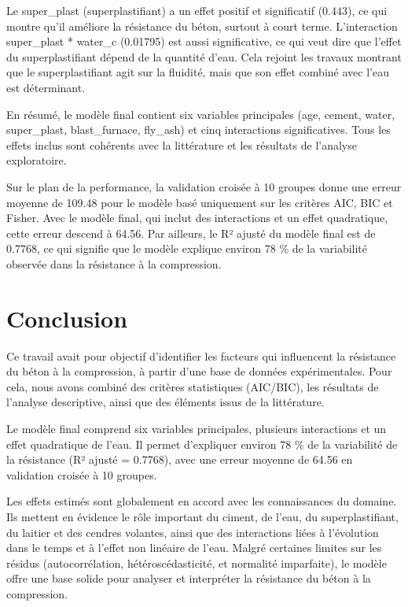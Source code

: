 \documentclass[
  12pt,
]{article}
\begin{document}
Le super\_plast (superplastifiant) a un effet positif et significatif
(0.443), ce qui montre qu'il améliore la résistance du béton, surtout à
court terme. L'interaction super\_plast * water\_c (0.01795) est aussi
significative, ce qui veut dire que l'effet du superplastifiant dépend
de la quantité d'eau. Cela rejoint les travaux montrant que le
superplastifiant agit sur la fluidité, mais que son effet combiné avec
l'eau est déterminant.

En résumé, le modèle final contient six variables principales (age,
cement, water, super\_plast, blast\_furnace, fly\_ash) et cinq
interactions significatives. Tous les effets inclus sont cohérents avec
la littérature et les résultats de l'analyse exploratoire.

Sur le plan de la performance, la validation croisée à 10 groupes donne
une erreur moyenne de 109.48 pour le modèle basé uniquement sur les
critères AIC, BIC et Fisher. Avec le modèle final, qui inclut des
interactions et un effet quadratique, cette erreur descend à 64.56. Par
ailleurs, le R² ajusté du modèle final est de 0.7768, ce qui signifie
que le modèle explique environ 78 \% de la variabilité observée dans la
résistance à la compression.

\section{Conclusion}\label{conclusion}

Ce travail avait pour objectif d'identifier les facteurs qui influencent
la résistance du béton à la compression, à partir d'une base de données
expérimentales. Pour cela, nous avons combiné des critères statistiques
(AIC/BIC), les résultats de l'analyse descriptive, ainsi que des
éléments issus de la littérature.

Le modèle final comprend six variables principales, plusieurs
interactions et un effet quadratique de l'eau. Il permet d'expliquer
environ 78 \% de la variabilité de la résistance (R² ajusté = 0.7768),
avec une erreur moyenne de 64.56 en validation croisée à 10 groupes.

Les effets estimés sont globalement en accord avec les connaissances du
domaine. Ils mettent en évidence le rôle important du ciment, de l'eau,
du superplastifiant, du laitier et des cendres volantes, ainsi que des
interactions liées à l'évolution dans le temps et à l'effet non linéaire
de l'eau. Malgré certaines limites sur les résidus (autocorrélation,
hétéroscédasticité, et normalité imparfaite), le modèle offre une base
solide pour analyser et interpréter la résistance du béton à la
compression.
\end{document}
